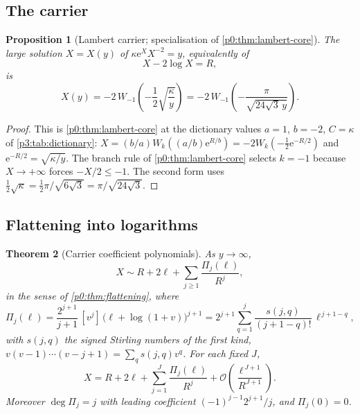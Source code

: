 \documentclass[11pt,a4paper,oneside]{book}
\theoremstyle{plain}
\newtheorem{theorem}{Theorem}[chapter]
\newtheorem{proposition}[theorem]{Proposition}
\theoremstyle{definition}
\theoremstyle{remark}
\newcommand{\e}{\mathrm{e}}
\newcommand{\Coef}[1]{[#1]\,}
\newcommand{\bigO}{\mathcal{O}}
\newcommand{\Wlam}{W}
\begin{document}
\subsection{The carrier}

\begin{proposition}[Lambert carrier; specialisation of
\cref{p0:thm:lambert-core}]\label{p3:prop:lambert-core} The large solution $X=X(y)$ of
$\kappa\e^{X}X^{-2}=y$, equivalently of
\begin{equation}\label{p3:eq:carrier-phase}
 X-2\log X=R,
\end{equation}
is
\begin{equation}\label{p3:eq:carrier}
 X(y)=-2\,\Wlam_{-1}\!\left(-\frac12\sqrt{\frac\kappa y}\right)
     =-2\,\Wlam_{-1}\!\left(-\frac{\pi}{\sqrt{24\sqrt3\,y}}\right).
\end{equation}
\end{proposition}

\begin{proof}
This is \cref{p0:thm:lambert-core} at the dictionary values $a=1$, $b=-2$, $C=\kappa$ of
\cref{p3:tab:dictionary}: $X=(b/a)\Wlam_{k}((a/b)\e^{R/b}) =-2\Wlam_{k}(-\tfrac12\e^{-R/2})$ and
$\e^{-R/2}=\sqrt{\kappa/y}$. The branch rule of \cref{p0:thm:lambert-core} selects $k=-1$ because
$X\to+\infty$ forces $-X/2\le-1$. The second form uses
$\tfrac12\sqrt\kappa=\tfrac12\pi/\sqrt{6\sqrt3} =\pi/\sqrt{24\sqrt3}$.
\end{proof}

\subsection{Flattening into logarithms}

\begin{theorem}[Carrier coefficient polynomials]\label{p3:thm:carrier-polys}
As $y\to\infty$,
\begin{equation}\label{p3:eq:carrier-flat}
 X\sim R+2\ell+\sum_{j\ge1}\frac{\Pi_{j}(\ell)}{R^{j}},
\end{equation}
in the sense of \cref{p0:thm:flattening}, where
\begin{equation}\label{p3:eq:Pi-lagrange}
 \Pi_{j}(\ell)=\frac{2^{j+1}}{j+1}\,\Coef{v^{j}}\bigl(\ell+\log(1+v)\bigr)^{j+1}
 =2^{j+1}\sum_{q=1}^{j}\frac{s(j,q)}{(j+1-q)!}\,\ell^{\,j+1-q},
\end{equation}
with $s(j,q)$ the signed Stirling numbers of the first kind,
$v(v-1)\cdots(v-j+1)=\sum_{q}s(j,q)v^{q}$. For each fixed $J$,
\begin{equation}\label{p3:eq:carrier-remainder}
 X=R+2\ell+\sum_{j=1}^{J}\frac{\Pi_{j}(\ell)}{R^{j}}
 +\bigO\!\left(\frac{\ell^{\,J+1}}{R^{J+1}}\right).
\end{equation}
Moreover $\deg\Pi_{j}=j$ with leading coefficient $(-1)^{j-1}2^{j+1}/j$, and $\Pi_{j}(0)=0$.
\end{theorem}
\end{document}
